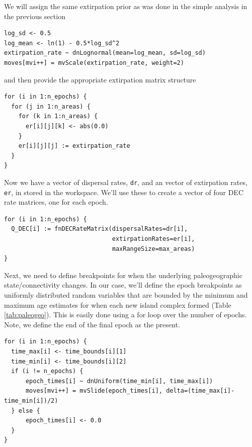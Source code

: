 We will assign the same extirpation prior as was done in the simple analysis in the previous section

\begin{snugshade}
\begin{lstlisting}
log_sd <- 0.5
log_mean <- ln(1) - 0.5*log_sd^2
extirpation_rate ~ dnLognormal(mean=log_mean, sd=log_sd)
moves[mvi++] = mvScale(extirpation_rate, weight=2)
\end{lstlisting}
\end{snugshade}

and then provide the appropriate extirpation matrix structure

\begin{snugshade}
\begin{lstlisting}
for (i in 1:n_epochs) {
  for (j in 1:n_areas) {
    for (k in 1:n_areas) {
      er[i][j][k] <- abs(0.0) 
    }
    er[i][j][j] := extirpation_rate
  }
}
\end{lstlisting}
\end{snugshade}

Now we have a vector of dispersal rates, {\tt dr}, and an vector of extirpation rates, {\tt er}, in stored in the \RevBayes workspace.
We'll use these to create a vector of four DEC rate matrices, one for each epoch.

\begin{snugshade}
\begin{lstlisting}
for (i in 1:n_epochs) {
  Q_DEC[i] := fnDECRateMatrix(dispersalRates=dr[i],
                              extirpationRates=er[i],
                              maxRangeSize=max_areas)
}
\end{lstlisting}
\end{snugshade}

Next, we need to define breakpoints for when the underlying paleogeographic state/connectivity changes.
In our case, we'll define the epoch breakpoints as uniformly distributed random variables that are bounded by the minimum and maximum age estimates for when each new island complex formed (Table \ref{tab:paleogeo}).
This is easily done using a for loop over the number of epochs.
Note, we define the end of the final epoch as the present.

\begin{snugshade}
\begin{lstlisting}
for (i in 1:n_epochs) {
  time_max[i] <- time_bounds[i][1]
  time_min[i] <- time_bounds[i][2]
  if (i != n_epochs) {
      epoch_times[i] ~ dnUniform(time_min[i], time_max[i])
      moves[mvi++] = mvSlide(epoch_times[i], delta=(time_max[i]-time_min[i])/2)
  } else {
      epoch_times[i] <- 0.0
  }
}
\end{lstlisting}
\end{snugshade}

